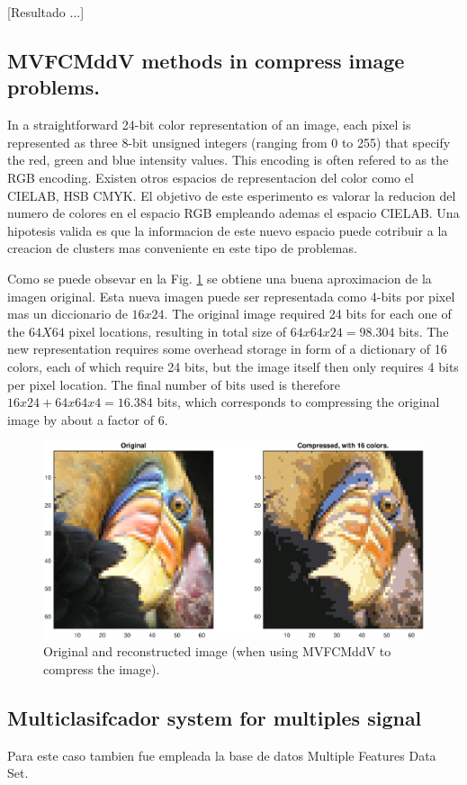 \documentclass[12pt]{article}
\begin{document}
[Resultado ...]


\subsection{MVFCMddV methods in compress image problems.}

In a straightforward 24-bit color representation of an image, each pixel is represented as three 8-bit unsigned integers (ranging from 0 to 255) that specify the red, green and blue intensity values. This encoding is often refered to as the RGB encoding. Existen otros espacios de representacion del color como el CIELAB, HSB CMYK. El objetivo de este esperimento es valorar la reducion del numero de colores en el espacio RGB empleando ademas el espacio CIELAB. Una hipotesis valida es que la informacion de este nuevo espacio puede cotribuir a la creacion de clusters mas conveniente en este tipo de problemas.  

Como se puede obsevar en la Fig. \ref{fig:image_compress} se obtiene una buena aproximacion de la imagen original. Esta nueva imagen puede ser representada como 4-bits por pixel mas un diccionario de $16x24$. The original image required 24 bits for each one of the $64X64$ pixel locations, resulting in total size of $64x64x24 = 98.304$ bits. The new representation requires some overhead storage in form of a dictionary of 16 colors, each of which require 24 bits, but the image itself then only requires 4 bits per pixel location. The final number of bits used is therefore $16x24 + 64x64x4 = 16.384$ bits, which corresponds to compressing the original image by about a factor of 6.


\begin{figure}[h]
\centering
\includegraphics[width=5.5in]{../out/image-compress-16.eps}
\caption{Original and reconstructed image (when using MVFCMddV to compress the image).}
\label{fig:image_compress}
\end{figure}  


\subsection{Multiclasifcador system for multiples signal}

Para este caso tambien fue empleada la base de datos Multiple Features Data Set. 
\end{document}
